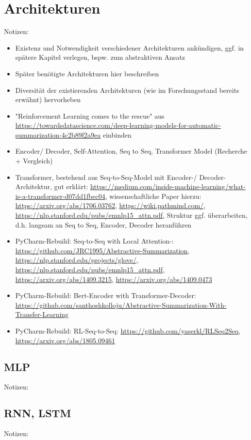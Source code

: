 \section{Architekturen}
Notizen:
\begin{itemize}
	\item Existenz und Notwendigkeit verschiedener Architekturen ankündigen, ggf. in spätere Kapitel verlegen, bspw. zum abstraktiven Ansatz
	\item Später benötigte Architekturen hier beschreiben
	\item Diversität der existierenden Architekturen (wie im Forschungsstand bereits erwähnt) hervorheben
	\item "Reinforcement Learning comes to the rescue" aus \url{https://towardsdatascience.com/deep-learning-models-for-automatic-summarization-4c2b89f2a9ea} einbinden
	\item Encoder/ Decoder, Self-Attention, Seq to Seq, Transformer Model (Recherche + Vergleich)
	\item Transformer, bestehend aus Seq-to-Seq-Model mit Encoder-/ Decoder-Architektur, gut erklärt: \url{https://medium.com/inside-machine-learning/what-is-a-transformer-d07dd1fbec04}, wissenschaftliche Paper hierzu: \url{https://arxiv.org/abs/1706.03762}, \url{https://wiki.pathmind.com/}, \url{https://nlp.stanford.edu/pubs/emnlp15_attn.pdf}, Struktur ggf. überarbeiten, d.h. langsam an Seq to Seq, Encoder, Decoder heranführen
	\item PyCharm-Rebuild: Seq-to-Seq with Local Attention-: \url{https://github.com/JRC1995/Abstractive-Summarization}, \url{https://nlp.stanford.edu/projects/glove/}, \url{https://nlp.stanford.edu/pubs/emnlp15_attn.pdf}, \url{https://arxiv.org/abs/1409.3215}, \url{https://arxiv.org/abs/1409.0473}
	\item PyCharm-Rebuild: Bert-Encoder with Transformer-Decoder: \url{https://github.com/santhoshkolloju/Abstractive-Summarization-With-Transfer-Learning}
	\item PyCharm-Rebuild: RL-Seq-to-Seq: \url{https://github.com/yaserkl/RLSeq2Seq}, \url{https://arxiv.org/abs/1805.09461}
\end{itemize}


\subsection{MLP}
Notizen:


\subsection{RNN, LSTM}
Notizen:


